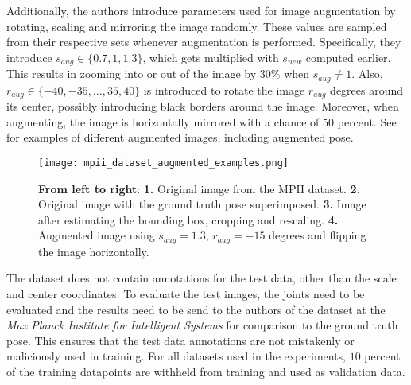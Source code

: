 Additionally, the authors introduce parameters used for image augmentation by rotating, scaling and mirroring the image randomly.
These values are sampled from their respective sets whenever augmentation is performed.
Specifically, they introduce $s_{aug} \in \{0.7, 1, 1.3\}$, which gets multiplied with $s_{new}$ computed earlier.
This results in zooming into or out of the image by $30\%$ when $s_{aug} \not= 1$. 
Also, $r_{aug} \in \{-40, -35, \dots, 35, 40\}$ is introduced to rotate the image $r_{aug}$ degrees around its center, possibly introducing black borders around the image.
Moreover, when augmenting, the image is horizontally mirrored with a chance of $50$ percent.
See  for examples of different augmented images, including augmented pose.

\begin{figure}[htb!]
    \centering
    \texttt{[image: mpii\_dataset\_augmented\_examples.png]}
    \caption{\textbf{From left to right}: \textbf{1.} Original image from the MPII dataset. \textbf{2.} Original image with the ground truth pose superimposed. \textbf{3.} Image after estimating the bounding box, cropping and rescaling. \textbf{4.} Augmented image using $s_{aug} = 1.3$, $r_{aug} = -15$ degrees and flipping the image horizontally.}
    \label{fig:mpii_example_augmentation}
\end{figure}



The dataset does not contain annotations for the test data, other than the scale and center coordinates.
To evaluate the test images, the joints need to be evaluated and the results need to be send to the authors of the dataset at the \textit{Max Planck Institute for Intelligent Systems} for comparison to the ground truth pose.
This ensures that the test data annotations are not mistakenly or maliciously used in training.
For all datasets used in the experiments, $10$ percent of the training datapoints are withheld from training and used as validation data.

